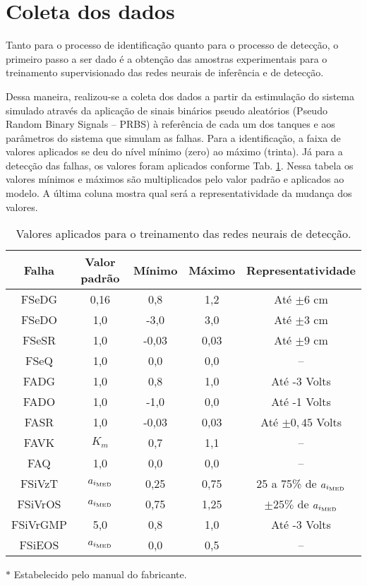 \section{Coleta dos dados}
Tanto para o processo de identificação quanto para o processo de detecção, o
primeiro passo a ser dado é a obtenção das amostras experimentais para o
treinamento supervisionado das redes neurais de inferência e de detecção.

Dessa maneira, realizou-se a coleta dos dados a partir da estimulação do sistema
simulado através da aplicação de sinais binários pseudo aleatórios ({Pseudo
Random Binary Signals} -- PRBS) à referência de cada um dos tanques e aos
parâmetros do sistema que simulam as falhas. Para a identificação, a faixa de
valores aplicados se deu do nível mínimo (zero) ao máximo (trinta). Já para a
detecção das falhas, os valores foram aplicados conforme Tab.
\ref{tab:valores_treinamento}. Nessa tabela os valores mínimos e máximos são
multiplicados pelo valor padrão e aplicados ao modelo. A última coluna mostra
qual será a representatividade da mudança dos valores.

\begin{table}[htb]
\caption{Valores aplicados para o treinamento das redes neurais de detecção.}
\label{tab:valores_treinamento}
\vspace{0.25cm}
\centering
\begin{threeparttable}
\begin{tabular}{|c|c|c|c|c|}
\hline
{\bf Falha} & {\bf Valor padrão} & {\bf Mínimo} & {\bf Máximo} & 
{\bf Representatividade}\\
\hline
\hline
FSeDG & 0,16\tnote{$*$} & 
0,8 & 1,2 & Até $\pm 6$ cm\\
\hline
FSeDO & 1,0 & -3,0 & 3,0 & Até $\pm 3$ cm\\
\hline
FSeSR & 1,0 & -0,03 & 0,03 & Até $\pm 9$ cm\\
\hline
FSeQ & 1,0 & 0,0 & 0,0 & -- \\
\hline
\hline
FADG & 1,0 & 0,8 & 1,0 & Até -3 Volts\\
\hline
FADO & 1,0 & -1,0 & 0,0 & Até -1 Volts\\
\hline
FASR & 1,0 & -0,03 & 0,03 & Até $\pm 0,45$ Volts\\
\hline
FAVK & $K_m$ & 0,7 & 1,1 & --\\
\hline
FAQ & 1,0 & 0,0 & 0,0 & --\\
\hline
\hline
FSiVzT & $a_{i_{\text{\tiny MED}}}$ & 
0,25 & 0,75 & 25 a 75\% de $a_{i_{\text{\tiny MED}}}$\\
\hline
FSiVrOS & $a_{i_{\text{\tiny MED}}}$ & 
0,75 & 1,25 & $\pm 25\%$ de $a_{i_{\text{\tiny MED}}}$\\
\hline
FSiVrGMP & 5,0\tnote{$*$} & 
0,8 & 1,0 & Até -3 Volts\\
\hline
FSiEOS & $a_{i_{\text{\tiny MED}}}$ & 
0,0 & 0,5 & --\\
\hline
\end{tabular}
\begin{tablenotes}
\item [$*$] Estabelecido pelo manual do fabricante.
\end{tablenotes}
\end{threeparttable}
\end{table}

